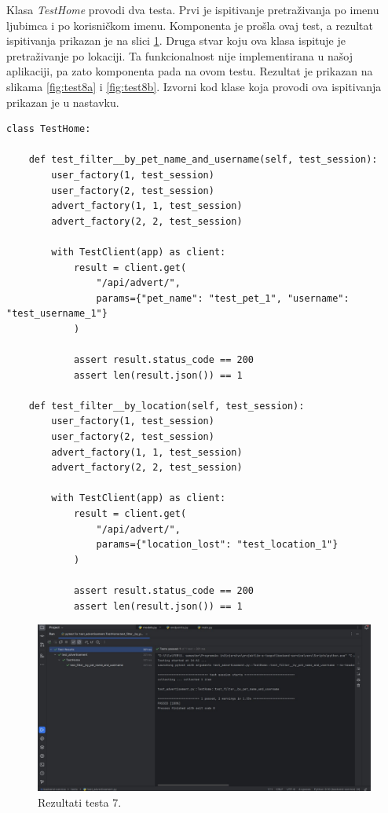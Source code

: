 			Klasa \textit{TestHome} provodi dva testa. Prvi je ispitivanje pretraživanja po imenu ljubimca i po korisničkom imenu. Komponenta je prošla ovaj test, a rezultat ispitivanja prikazan je na slici \ref{fig:test7}. Druga stvar koju ova klasa ispituje je pretraživanje po lokaciji. Ta funkcionalnost nije implementirana u našoj aplikaciji, pa zato komponenta pada na ovom testu. Rezultat je prikazan na slikama \ref{fig:test8a} i \ref{fig:test8b}. Izvorni kod klase koja provodi ova ispitivanja prikazan je u nastavku.
			\begin{lstlisting}
class TestHome:

    def test_filter__by_pet_name_and_username(self, test_session):
        user_factory(1, test_session)
        user_factory(2, test_session)
        advert_factory(1, 1, test_session)
        advert_factory(2, 2, test_session)

        with TestClient(app) as client:
            result = client.get(
                "/api/advert/",
                params={"pet_name": "test_pet_1", "username": "test_username_1"}
            )

            assert result.status_code == 200
            assert len(result.json()) == 1

    def test_filter__by_location(self, test_session):
        user_factory(1, test_session)
        user_factory(2, test_session)
        advert_factory(1, 1, test_session)
        advert_factory(2, 2, test_session)

        with TestClient(app) as client:
            result = client.get(
                "/api/advert/",
                params={"location_lost": "test_location_1"}
            )

            assert result.status_code == 200
            assert len(result.json()) == 1
			\end{lstlisting}

			\begin{figure}[H]
			 	\includegraphics[scale=0.42]{slike/test7.jpg} %
			 	\centering
			 	\caption{Rezultati testa 7.}
			 	\label{fig:test7}
			 \end{figure}

